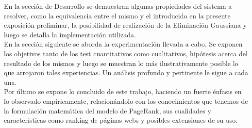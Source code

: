En la sección de Desarrollo se demuestran algunas propiedades del sistema a resolver, como la equivalencia entre el mismo y el introducido en la presente exposición preliminar, la posibilidad de realización de la Eliminación Gaussiana y luego se detalla la implementación utilizada.\\

En la sección siguiente se aborda la experimentación llevada a cabo. Se exponen los objetivos tanto de los test cuantitativos como cualitativos, hipótesis acerca del resultado de los mismos y luego se muestran lo más ilustrativamente posible lo que arrojaron tales experiencias. Un análisis profundo y pertinente le sigue a cada una. \\

Por último se expone lo concluido de este trabajo, haciendo un fuerte énfasis en lo observado empíricamente, relacionándolo con los conocimientos que tenemos de la formulación matemática del modelo de PageRank, sus cualidades y características como ranking de páginas webs y posibles extensiones de su uso.
